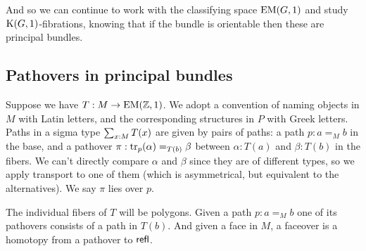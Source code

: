 And so we can continue to work with the classifying space \( \mathrm{EM}(G,1) \) and study \( \mathrm{K}(G,1) \)-fibrations, knowing that if the bundle is orientable then these are principal bundles.

\subsection{Pathovers in principal bundles}
Suppose we have \( T:M\to\mathrm{EM}(\mathbb{Z},1) \). We adopt a convention of naming objects in \( M \) with Latin letters, and the corresponding structures in \( P \) with Greek letters. Paths in a sigma type \( \sum_{x:M}T(x) \) are given by pairs of paths: a path \( p:a=_M b \) in the base, and a pathover \( \pi:\mathrm{tr}_p(\alpha)=_{T(b)}\beta \) between \( \alpha:T(a) \) and \( \beta:T(b) \) in the fibers. We can't directly compare \( \alpha \) and \( \beta \) since they are of different types, so we apply transport to one of them (which is asymmetrical, but equivalent to the alternatives). We say \( \pi \) lies over \( p \). 

The individual fibers of \( T \) will be polygons. Given a path \( p:a=_M b \) one of its pathovers consists of a path in \( T(b) \). And given a face in \( M \), a faceover is a homotopy from a pathover to \( \mathsf{refl} \).


